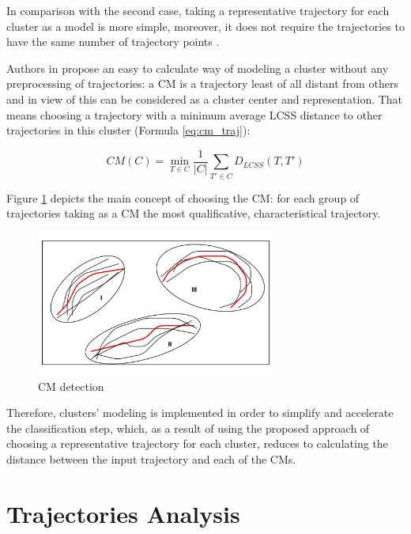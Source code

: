In comparison with the second case, taking a representative trajectory for each cluster as a model is more simple, moreover, it does not require the trajectories to have the same number of trajectory points \cite{inproceedings:7_related_work}.

Authors in \cite{inproceedings:7_related_work} propose an easy to calculate way of modeling a cluster without any preprocessing of trajectories: a CM is a trajectory least of all distant from others and in view of this can be considered as a cluster center and representation. That means choosing a trajectory with a minimum average LCSS distance to other trajectories in this cluster (Formula \ref{eq:cm_traj}):

\begin{equation} \label{eq:cm_traj}
	CM(C) = \min\limits_{T \in C} \frac{1}{|C|} \sum_{T' \in C} D_{LCSS}(T, T')
\end{equation}

Figure \ref{fig:cm-modeling} depicts the main concept of choosing the CM: for each group of trajectories taking as a CM the most qualificative, characteristical trajectory.

\begin{figure}[!htb]
	\centering{}
	\includegraphics[width=0.7\textwidth]{images/cm-modeling.png}
	\caption{CM detection}
	\label{fig:cm-modeling}
\end{figure}

Therefore, clusters' modeling is implemented in order to simplify and accelerate the classification step, which, as a result of using the proposed approach of choosing a representative trajectory for each cluster, reduces to calculating the distance between the input trajectory and each of the CMs.

\section{Trajectories Analysis}

